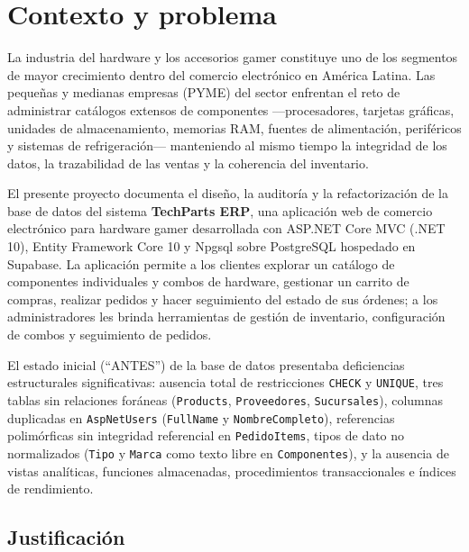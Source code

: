 
\section{Contexto y problema}

La industria del hardware y los accesorios gamer constituye uno de los segmentos de mayor crecimiento dentro del comercio electrónico en América Latina.
Las pequeñas y medianas empresas (PYME) del sector enfrentan el reto de administrar catálogos extensos de componentes ---procesadores, tarjetas gráficas, unidades de almacenamiento, memorias RAM, fuentes de alimentación, periféricos y sistemas de refrigeración--- manteniendo al mismo tiempo la integridad de los datos, la trazabilidad de las ventas y la coherencia del inventario.

El presente proyecto documenta el diseño, la auditoría y la refactorización de la base de datos del sistema \textbf{TechParts ERP}, una aplicación web de comercio electrónico para hardware gamer desarrollada con ASP.NET Core MVC (.NET 10), Entity Framework Core 10 y Npgsql sobre PostgreSQL hospedado en Supabase.
La aplicación permite a los clientes explorar un catálogo de componentes individuales y combos de hardware, gestionar un carrito de compras, realizar pedidos y hacer seguimiento del estado de sus órdenes; a los administradores les brinda herramientas de gestión de inventario, configuración de combos y seguimiento de pedidos.

El estado inicial (``ANTES'') de la base de datos presentaba deficiencias estructurales significativas:
ausencia total de restricciones \texttt{CHECK} y \texttt{UNIQUE},
tres tablas sin relaciones foráneas (\texttt{Products}, \texttt{Proveedores}, \texttt{Sucursales}),
columnas duplicadas en \texttt{AspNetUsers} (\texttt{FullName} y \texttt{NombreCompleto}),
referencias polimórficas sin integridad referencial en \texttt{PedidoItems},
tipos de dato no normalizados (\texttt{Tipo} y \texttt{Marca} como texto libre en \texttt{Componentes}),
y la ausencia de vistas analíticas, funciones almacenadas, procedimientos transaccionales e índices de rendimiento.

\subsection{Justificación}

